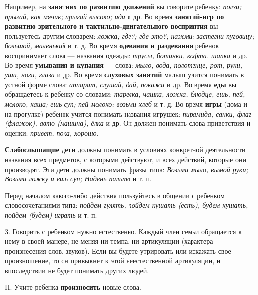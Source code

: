 \documentclass{book}
\renewcommand{\emph}[1]{\textit{#1}}
\begin{document}
Например, на \textbf{занятиях по развитию движений} вы говорите ребенку:
\emph{ползи; прыгай, как мячик; прыгай высоко; иди} и др. Во время
\textbf{занятий-игр по развитию зрительного и тактильно-двигательного
восприятия} вы пользуетесь другим словарем: \emph{ложка; где?; где это?;
нажми; застегни пуговицу; большой, маленький} и т. д. Во время
\textbf{одевания и раздевания} ребенок воспринимает слова --- названия
одежды: \emph{трусы, ботинки, кофта, шапка} и др. Во время
\textbf{умывания и купания} --- слова: \emph{мыло, вода, полотенце, рот,
руки, уши, ноги, глаза} и др. Во время \textbf{слуховых занятий} малыш
учится понимать в устной форме слова: \emph{аппарат, слушай, дай,
покажи} и др. Во время \textbf{еды} вы обращаетесь к ребенку со словами:
\emph{тарелка, чашка, ложка, блюдце, ешь, пей, молоко, каша; ешь суп;
пей молоко; возьми хлеб} и т. д. Во время \textbf{игры} (дома и на
прогулке) ребенок учится понимать названия игрушек: \emph{пирамида,
санки, флаг (флажок), авто (машина), ёлка} и др. Он должен понимать
слова-приветствия и оценки: \emph{привет, пока, хорошо.}

\textbf{Слабослышащие дети} должны понимать в условиях конкретной
деятельности названия всех предметов, с которыми действуют, и всех
действий, которые они производят. Эти дети должны понимать фразы типа:
\emph{Возьми мыло, вымой руки; Возьми ложку и ешь суп; Надень пальто} и
т. п.

Перед началом какого-либо действия пользуйтесь в общении с ребенком
словосочетаниями типа: \emph{пойдем гулять, пойдем кушать (есть), будем
кушать, пойдем (будем) играть} и т. п.

3. Говорить с ребенком нужно естественно. Каждый член семьи обращается к
нему в своей манере, не меняя ни темпа, ни артикуляции (характера
произнесения слов, звуков). Если вы будете утрировать или искажать свое
произношение, то он привыкнет к этой неестественной артикуляции, и
впоследствии не будет понимать других людей.

II. Учите ребенка \textbf{произносить} новые слова.
\end{document}
